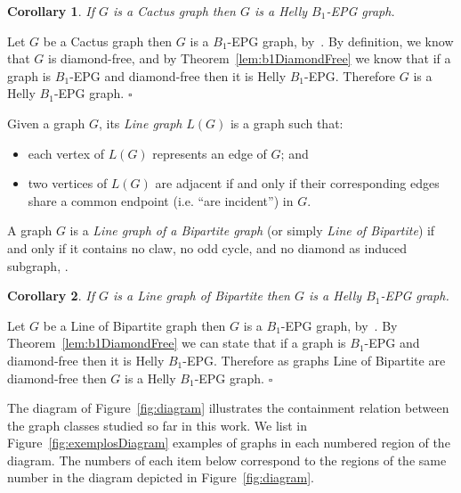 \documentclass[9pt]{entcs}
\newtheorem{coro}{Corollary}[section]
\begin{document}
 
\begin{coro}
If $G$ is a Cactus graph then $G$ is a Helly $B_1$-EPG graph.
\end{coro}
\begin{pf}
Let $G$ be a Cactus graph then $G$ is a $B_1$-EPG graph, by~\cite{cela2019monotonic}. By definition, we know that $G$ is diamond-free, and by Theorem~\ref{lem:b1DiamondFree} we know that if a graph is $B_1$-EPG and diamond-free then it is  Helly $B_1$-EPG. Therefore $G$ is a Helly $B_1$-EPG graph.
$\square$\end{pf}

Given a graph $G$, its \textit{Line graph} $L(G)$ is a graph such that:
\begin{itemize}
    \item each vertex of $L(G)$ represents an edge of $G$; and
    \item two vertices of $L(G)$ are adjacent if and only if their corresponding edges share a common endpoint (i.e. ``are incident'') in $G$. 
\end{itemize}




A graph $G$ is a \textit{Line graph of a Bipartite graph} (or simply \textit{Line of Bipartite}) if and only if it
contains no claw, no odd cycle, and no diamond as induced subgraph, \cite{harary1974line}.



\begin{coro}\label{coro:lineOfBipartite}
If $G$ is a Line graph of Bipartite then $G$ is a Helly $B_1$-EPG graph. 
\end{coro}

\begin{pf}
Let $G$ be a Line of Bipartite graph then $G$ is a $B_1$-EPG graph, by~\cite{golumbic2018edge}. By Theorem~\ref{lem:b1DiamondFree} we can state that if  a graph is $B_1$-EPG and diamond-free then it is  Helly $B_1$-EPG. Therefore as graphs Line of Bipartite are diamond-free then $G$ is a Helly $B_1$-EPG graph. 
$\square$
\end{pf}

The diagram of Figure~\ref{fig:diagram}
illustrates the containment relation between the graph classes  studied so far in this work. 
We list in Figure~\ref{fig:exemplosDiagram} examples of graphs in each numbered region of the diagram. The numbers of each item below correspond to the regions of the same number in the diagram depicted in Figure~\ref{fig:diagram}.

\end{document}
